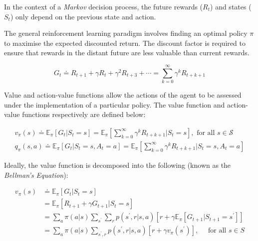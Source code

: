 \documentclass[12pt, authoryear]{elsarticle}
\begin{document}
In the context of a \textit{Markov} decision process, the future rewards ($R_{t}$) and states ($S_{t}$) only depend on the previous state and action. 

The general reinforcement learning paradigm involves finding an optimal policy $\pi$ to maximise the expected discounted return. The discount factor is required to ensure that rewards in the distant future are less valuable than current rewards.

$$
G _ { t } \doteq R _ { t + 1 } + \gamma R _ { t  } + \gamma ^ { 2 } R _ { t + 3 } + \cdots = \sum _ { k = 0 } ^ { \infty } \gamma ^ { k } R _ { t + k + 1 }
$$

Value and action-value functions allow the actions of the agent to be assessed under the implementation of a particular policy. The value function and action-value functions respectively are defined below:

$$
\begin{aligned}
v _ { \pi } ( s ) \doteq \mathbb { E } _ { \pi } \left[ G _ { t } | S _ { t } = s \right] = \mathbb { E } _ { \pi } \left[ \sum _ { k = 0 } ^ { \infty } \gamma ^ { k } R _ { t + k + 1 } | S _ { t } = s \right] , \text { for all } s \in \mathcal{S} \\
q _ { \pi } ( s , a ) \doteq \mathbb { E } _ { \pi } \left[ G _ { t } | S _ { t } = s , A _ { t } = a \right] = \mathbb { E } _ { \pi } \left[ \sum _ { k = 0 } ^ { \infty } \gamma ^ { k } R _ { t + k + 1 } | S _ { t } = s , A _ { t } = a \right]
\end{aligned}
$$ 

Ideally, the value function is decomposed into the following (known as the \textit{Bellman's Equation}):

$$
\begin{aligned} v _ { \pi } ( s ) & \doteq \mathbb { E } _ { \pi } \left[ G _ { t } | S _ { t } = s \right] \\ & = \mathbb { E } _ { \pi } \left[ R _ { t + 1 } + \gamma G _ { t + 1 } | S _ { t } = s \right] \\ & = \sum _ { a } \pi ( a | s ) \sum _ { s ^ { \prime } } \sum _ { r } p \left( s ^ { \prime } , r | s , a \right) \left[ r + \gamma \mathbb { E } _ { \pi } \left[ G _ { t + 1 } | S _ { t + 1 } = s ^ { \prime } \right] \right] \\ & = \sum _ { a } \pi ( a | s ) \sum _ { s ^ { \prime } , r } p \left( s ^ { \prime } , r | s , a \right) \left[ r + \gamma v _ { \pi } \left( s ^ { \prime } \right) \right] , \quad \text { for all } s \in S \end{aligned}
$$
\end{document}
